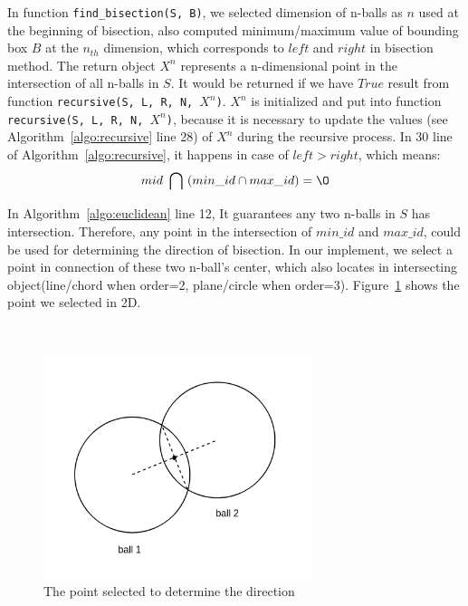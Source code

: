 In function \texttt{find\_bisection(S, B)}, we selected dimension of n-balls as
$n$ used at the beginning of bisection, also computed minimum/maximum value of
bounding box $B$ at the $n_{th}$ dimension, which corresponds to $left$ and $right$ in
bisection method. The return object $X^n$ represents a n-dimensional point in the intersection of all n-balls in $S$. It would be
returned if we have $True$ result from function \texttt{recursive(S, L, R, N, $X^n$)}. $X^n$ is initialized and put into function \texttt{recursive(S, L, R, N, $X^n$)}, because
it is necessary to update the values (see Algorithm~\ref{algo:recursive} line
28) of $X^n$ during the recursive process. In 30 line of Algorithm~\ref{algo:recursive}, it
happens in case of $left > right$, which means:
\begin{equation*}
    mid \  \bigcap \  (min\_id \cap max\_id) = \O
\end{equation*}

In Algorithm~\ref{algo:euclidean} line 12, It guarantees any two n-balls in $S$ has
intersection. Therefore, any point in the intersection of $min\_id$ and
$max\_id$, could be used for determining the direction of bisection. In our
implement, we select a point in connection of these two n-ball's center, which
also locates in intersecting object(line/chord when order=2, plane/circle when
order=3). Figure~\ref{fig:compare_point} shows the point we selected in 2D.

\\

\begin{figure}
  \centering
\includegraphics[width=0.7\textwidth]{figures/point-in-chord.png}
\caption{The point selected to determine the direction}
\label{fig:compare_point}
\end{figure}


